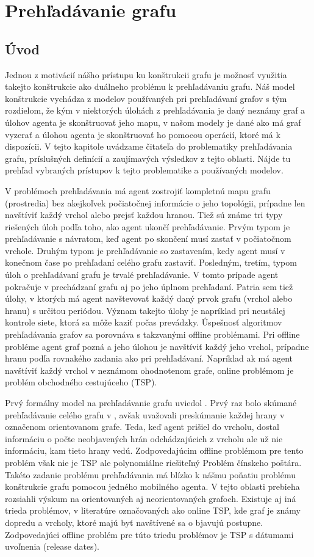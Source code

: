 \chapter{Prehľadávanie grafu}
\thispagestyle{empty}
\section{Úvod}
Jednou z motivácií nášho prístupu ku konštrukcii grafu je možnosť využitia
takejto konštrukcie ako duálneho problému k prehľadávaniu grafu. Náš model
konštrukcie vychádza z modelov používaných pri prehľadávaní grafov s tým
rozdielom, že kým v niektorých úlohách z prehľadávania je daný neznámy graf
a úlohov agenta je skonštruovať jeho mapu, v našom modely je dané ako má
graf vyzerať a úlohou agenta je skonštruovať ho pomocou operácií, ktoré má k
dispozícii.
V tejto kapitole uvádzame čitateľa do problematiky prehľadávania grafu, 
príslušných definícií a zaujímavých výsledkov z tejto oblasti. Nájde tu
prehľad vybraných prístupov k tejto problematike a používaných modelov.

V problémoch prehľadávania má agent zostrojiť kompletnú mapu grafu 
(prostredia) bez akejkoľvek počiatočnej informácie o jeho topológii,
prípadne len navštíviť každý vrchol alebo prejsť každou hranou.
Tiež sú známe tri typy riešených úloh podľa toho, ako agent ukončí
prehľadávanie. Prvým typom je prehľadávanie s návratom, keď agent po
skončení musí zastať v počiatočnom vrchole. Druhým typom je prehľadávanie so
zastavením, kedy agent musí v konečnom čase po prehľadaní celého grafu
zastaviť. Posledným, tretím, typom úloh o prehľadávaní grafu je trvalé
prehľadávanie. V tomto prípade agent pokračuje v prechádzaní grafu aj po
jeho úplnom prehľadaní. Patria sem tiež úlohy, v ktorých má agent
navštevovať každý daný prvok grafu (vrchol alebo hranu) s určitou periódou.
Význam takejto úlohy je napríklad pri neustálej kontrole siete, ktorá sa
môže kaziť počas prevádzky.
Úspešnosť algoritmov prehľadávania grafov sa porovnáva s takzvanými offline
problémami. Pri offline probléme agent graf pozná a jeho úlohou je navštíviť
každý jeho vrchol, prípadne hranu podľa rovnakého zadania ako pri
prehľadávaní. Napríklad ak má agent navštíviť každý vrchol v neznámom
ohodnotenom grafe, online problémom je problém obchodného cestujúceho (TSP).

Prvý formálny model na prehľadávanie grafu uviedol \cite{SPWM}.
Prvý raz bolo skúmané prehľadávanie celého grafu v \cite{EUG}, 
avšak uvažovali preskúmanie každej hrany v označenom orientovanom grafe. 
Teda, keď agent prišiel do vrcholu, dostal informáciu o počte neobjavených
hrán odchádzajúcich z vrcholu ale už nie informáciu, kam tieto hrany vedú.
Zodpovedajúcim offline problémom pre tento problém však nie je TSP 
ale polynomiálne riešiteľný Problém čínskeho poštára.
Takéto zadanie problému prehľadávania má blízko k nášmu poňatiu 
problému konštrukcie grafu pomocou jedného mobilného agenta. V tejto oblasti
prebieha rozsiahli výskum na orientovaných aj neorientovaných grafoch.
Existuje aj iná trieda problémov, v literatúre označovaných ako online TSP, 
kde graf je známy dopredu a vrcholy, ktoré majú byť navštívené sa o
bjavujú postupne. 
Zodpovedajúci offline problém pre túto triedu problémov je TSP s dátumami
uvoľnenia (release dates).


